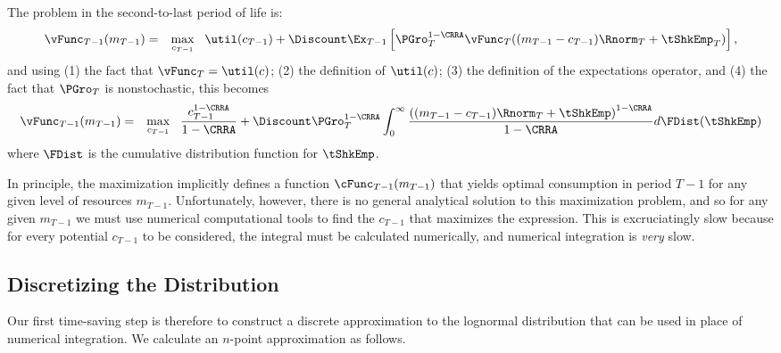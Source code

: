 \documentclass[titlepage]{\econtex}
\begin{document}
The problem in the second-to-last period of life is:
\begin{eqnarray*}
  \null{\vFunc}_{T-1}({m}_{T-1}) & = & \max_{{c}_{T-1}} ~~ \util({c}_{T-1}) +
                                       \Discount \Ex_{T-1} \left[\PGro_{T}^{1-\CRRA}\null{\vFunc}_{T}(({m}_{T-1} - {c}_{T-1})\Rnorm_{T} + \tShkEmp_{T})\right],
\end{eqnarray*}
and using (1) the fact that $\vFunc_{T}=\util(c)$; (2) the definition of $\util(c)$; (3) the
definition of the expectations operator, and (4) the fact that $\PGro_{T}$ is nonstochastic, this becomes
\begin{eqnarray*}
  \null{\vFunc}_{T-1}({m}_{T-1})  & = & \max_{{c}_{T-1}} ~~
                                        \frac{{c}_{T-1}^{1-\CRRA}}{1-\CRRA} + \Discount \PGro_{T}^{1-\CRRA}\int_{0}^{\infty}
                                        \frac{\left(({m}_{T-1}-{c}_{T-1})\Rnorm_{T}+ \tShkEmp\right)^{1-\CRRA}}{1-\CRRA}
                                        d\FDist(\tShkEmp)
\end{eqnarray*}
where $\FDist$ is the cumulative distribution function for ${\tShkEmp}$.

In principle, the maximization implicitly defines a function  
$\cFunc_{T-1}({m}_{T-1})$ that yields optimal consumption
in period $T-1$ for any given level of resources ${m}_{T-1}$.
Unfortunately, however, there is no general analytical solution to this
maximization problem, and so for any given ${m}_{T-1}$ we must
use numerical computational tools to find the ${c}_{T-1}$ that maximizes the
expression.  This is excruciatingly slow because for every
potential ${c}_{T-1}$ to be considered, the integral must be calculated
numerically, and numerical integration is \textit{very} slow.

\hypertarget{Discretizing-the-Distribution}{}
\subsection{Discretizing the Distribution}
Our first time-saving step is therefore to construct a discrete
approximation to the lognormal distribution that can be used in place
of numerical integration.  We calculate an $n$-point approximation as
follows.
\end{document}
